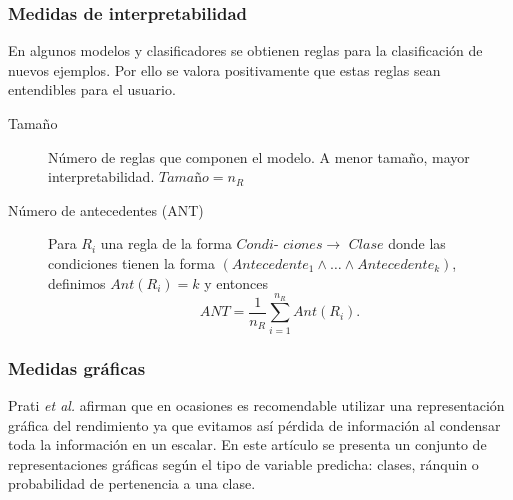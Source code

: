 \subsubsection*{Medidas de interpretabilidad} 
	En algunos modelos y clasificadores se obtienen reglas 
para la clasificación de nuevos ejemplos. Por ello se valora 
positivamente que estas reglas sean entendibles para el 
usuario. 
	\begin{description}
	\item[Tamaño] Número de reglas que componen el modelo. 
		A menor tamaño, mayor interpretabilidad. 
		$\textit{Tamaño} = n_R$
	\item[Número de antecedentes (ANT)] Para $R_i$ una regla 
		de la forma $\textit{Condi-}$ ${ciones } \rightarrow 
		\textit{ Clase}$ donde las condiciones tienen la 
		forma $(Antecedente_1 \wedge \dots \wedge 
		Antecedente_k)$, definimos $Ant(R_i) = k$ y entonces 
		\[ANT = \frac{1}{n_R} 
				\sum\limits_{i=1}^{n_R} Ant(R_i).\]
	\end{description}


\subsubsection*{Medidas gráficas}

	Prati \textit{et al.} \cite{DBLP:journals/tkde/PratiBM11} afirman que en ocasiones es 
recomendable utilizar una representación gráfica del 
rendimiento ya que evitamos así pérdida de información al 
condensar toda la información en un escalar. En este artículo 
se presenta un conjunto de representaciones gráficas según el 
tipo de variable predicha: clases, ránquin o probabilidad de 
pertenencia a una clase.
	

